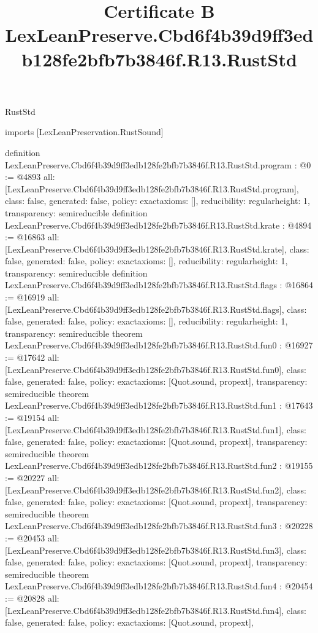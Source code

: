 \begin{lexlean}{RustStd}
\title{Certificate B LexLeanPreserve.Cbd6f4b39d9ff3edb128fe2bfb7b3846f.R13.RustStd}
\begin{coremodule}
imports [LexLeanPreservation.RustSound]

definition LexLeanPreserve.Cbd6f4b39d9ff3edb128fe2bfb7b3846f.R13.RustStd.program : @0 := @4893 {
  all: [LexLeanPreserve.Cbd6f4b39d9ff3edb128fe2bfb7b3846f.R13.RustStd.program],
  class: false,
  generated: false,
  policy: exact{axioms: []},
  reducibility: regular{height: 1},
  transparency: semireducible
}
definition LexLeanPreserve.Cbd6f4b39d9ff3edb128fe2bfb7b3846f.R13.RustStd.krate : @4894 := @16863 {
  all: [LexLeanPreserve.Cbd6f4b39d9ff3edb128fe2bfb7b3846f.R13.RustStd.krate],
  class: false,
  generated: false,
  policy: exact{axioms: []},
  reducibility: regular{height: 1},
  transparency: semireducible
}
definition LexLeanPreserve.Cbd6f4b39d9ff3edb128fe2bfb7b3846f.R13.RustStd.flags : @16864 := @16919 {
  all: [LexLeanPreserve.Cbd6f4b39d9ff3edb128fe2bfb7b3846f.R13.RustStd.flags],
  class: false,
  generated: false,
  policy: exact{axioms: []},
  reducibility: regular{height: 1},
  transparency: semireducible
}
theorem LexLeanPreserve.Cbd6f4b39d9ff3edb128fe2bfb7b3846f.R13.RustStd.fun0 : @16927 := @17642 {
  all: [LexLeanPreserve.Cbd6f4b39d9ff3edb128fe2bfb7b3846f.R13.RustStd.fun0],
  class: false,
  generated: false,
  policy: exact{axioms: [Quot.sound, propext]},
  transparency: semireducible
}
theorem LexLeanPreserve.Cbd6f4b39d9ff3edb128fe2bfb7b3846f.R13.RustStd.fun1 : @17643 := @19154 {
  all: [LexLeanPreserve.Cbd6f4b39d9ff3edb128fe2bfb7b3846f.R13.RustStd.fun1],
  class: false,
  generated: false,
  policy: exact{axioms: [Quot.sound, propext]},
  transparency: semireducible
}
theorem LexLeanPreserve.Cbd6f4b39d9ff3edb128fe2bfb7b3846f.R13.RustStd.fun2 : @19155 := @20227 {
  all: [LexLeanPreserve.Cbd6f4b39d9ff3edb128fe2bfb7b3846f.R13.RustStd.fun2],
  class: false,
  generated: false,
  policy: exact{axioms: [Quot.sound, propext]},
  transparency: semireducible
}
theorem LexLeanPreserve.Cbd6f4b39d9ff3edb128fe2bfb7b3846f.R13.RustStd.fun3 : @20228 := @20453 {
  all: [LexLeanPreserve.Cbd6f4b39d9ff3edb128fe2bfb7b3846f.R13.RustStd.fun3],
  class: false,
  generated: false,
  policy: exact{axioms: [Quot.sound, propext]},
  transparency: semireducible
}
theorem LexLeanPreserve.Cbd6f4b39d9ff3edb128fe2bfb7b3846f.R13.RustStd.fun4 : @20454 := @20828 {
  all: [LexLeanPreserve.Cbd6f4b39d9ff3edb128fe2bfb7b3846f.R13.RustStd.fun4],
  class: false,
  generated: false,
  policy: exact{axioms: [Quot.sound, propext]},
}
\end{coremodule}
\end{lexlean}
